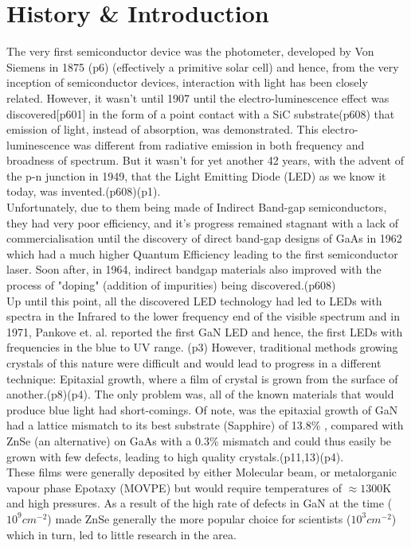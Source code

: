 \documentclass[titlepage]{article}
\begin{document}
\section{History \& Introduction}
The very first semiconductor device was the photometer, developed by Von Siemens in 1875 \cite{G3Nsemicomp}(p6) (effectively a primitive solar cell) and hence, from the very inception of semiconductor devices, interaction with light has been closely related. However, it wasn't until 1907 until the electro-luminescence effect was discovered\cite{Sze}[p601] in the form of a point contact with a SiC substrate\cite{Sze}(p608) that emission of light, instead of absorption, was demonstrated. This electro-luminescence was different from radiative emission in both frequency and broadness of spectrum. But it wasn't for yet another 42 years, with the advent of the p-n junction in 1949, that the Light Emitting Diode (LED) as we know it today, was invented.\cite{Sze}(p608)\cite{G3Nsemicomp}(p1). \\
Unfortunately, due to them being made of Indirect Band-gap semiconductors, they had very poor efficiency, and it's progress remained stagnant with a lack of commercialisation\cite{G3Nsemicomp} until the discovery of direct band-gap designs of GaAs in 1962 which had a much higher Quantum Efficiency leading to the first semiconductor laser. Soon after, in 1964, indirect bandgap materials also improved with the process of "doping" (addition of impurities) being discovered.\cite{Sze}(p608) \\
Up until this point, all the discovered LED technology had led to LEDs with spectra in the Infrared to the lower frequency end of the visible spectrum and in 1971, Pankove et. al. reported the first GaN LED and hence, the first LEDs with frequencies in the blue to UV range. \cite{NSD}(p3) However, traditional methods growing crystals of this nature were difficult and would lead to progress in a different technique: Epitaxial growth, where a film of crystal is grown from the surface of another.\cite{G3Nsemicomp}(p8)\cite{Nakamura}(p4). The only problem was, all of the known materials that would produce blue light had short-comings. Of note, was the epitaxial growth of GaN had a lattice mismatch to its best substrate (Sapphire) of 13.8\% , compared with ZnSe (an alternative) on GaAs with a 0.3\% mismatch and could thus easily be grown with few defects, leading to high quality crystals.\cite{G3Nsemicomp}(p11,13)\cite{Nakamura}(p4). \\
These films were generally deposited by either Molecular beam, or metalorganic vapour phase Epotaxy (MOVPE) but would require temperatures of $\approx1300$K and high pressures. As a result of the high rate of defects in GaN at the time ($10^9cm^{-2}$) made ZnSe generally the more popular choice for scientists ($10^3cm^{-2}$) which in turn, led to little research in the area.\cite{Nakamura}\\
\end{document}

